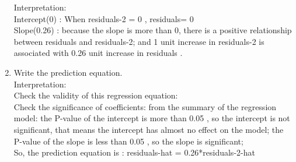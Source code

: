 \documentclass[12pt,letterpaper]{article}
\begin{document}
\begin{enumerate}
		\vspace{1cm}
		\noindent
		Interpretation:\\
		Intercept(0) : When residuals-2 = 0 , residuals= 0\\
		Slope(0.26) : because the slope is more than 0, there is a positive relationship between residuals and residuals-2; and 1 unit increase in residuals-2 is associated with 0.26 unit increase in residuals .\\
		\item Write the prediction equation.\\
		\vspace{1cm}
		\noindent
		Interpretation:\\
		Check the validity of this regression equation:\\
		Check the significance of coefficients: from the summary of the regression model: the P-value of the intercept is more than 0.05 , so the intercept is not significant, that means the intercept has almost no effect on the model; the P-value of the slope is less than 0.05 , so the slope is significant; \\
		
		So, the prediction equation is : residuals-hat = 0.26*residuals-2-hat
	\end{enumerate}
	
	\newpage	
\end{document}
